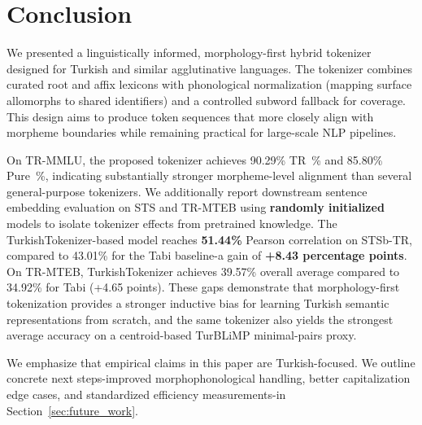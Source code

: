 \section{Conclusion}
\label{sec:conclusion}

We presented a linguistically informed, morphology-first hybrid tokenizer designed for Turkish and similar agglutinative languages. The tokenizer combines curated root and affix lexicons with phonological normalization (mapping surface allomorphs to shared identifiers) and a controlled subword fallback for coverage. This design aims to produce token sequences that more closely align with morpheme boundaries while remaining practical for large-scale NLP pipelines.

On TR-MMLU, the proposed tokenizer achieves 90.29\% TR~\% and 85.80\% Pure~\%, indicating substantially stronger morpheme-level alignment than several general-purpose tokenizers. We additionally report downstream sentence embedding evaluation on STS and TR-MTEB using \textbf{randomly initialized} models to isolate tokenizer effects from pretrained knowledge. The TurkishTokenizer-based model reaches \textbf{51.44\%} Pearson correlation on STSb-TR, compared to 43.01\% for the Tabi baseline-a gain of \textbf{+8.43 percentage points}. On TR-MTEB, TurkishTokenizer achieves 39.57\% overall average compared to 34.92\% for Tabi (+4.65 points). These gaps demonstrate that morphology-first tokenization provides a stronger inductive bias for learning Turkish semantic representations from scratch, and the same tokenizer also yields the strongest average accuracy on a centroid-based TurBLiMP minimal-pairs proxy.

We emphasize that empirical claims in this paper are Turkish-focused. We outline concrete next steps-improved morphophonological handling, better capitalization edge cases, and standardized efficiency measurements-in Section~\ref{sec:future_work}.
